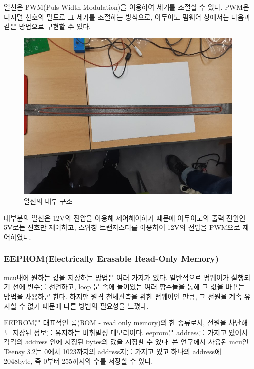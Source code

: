 \documentclass[twoside,11pt]{gshs_thesis}
\begin{document}
 열선은 PWM(Puls Width Modulation)을 이용하여 세기를 조절할 수 있다. PWM은 디지털 신호의 밀도로 그 세기를 조절하는 방식으로, 아두이노 펌웨어 상에서는 다음과 같은 방법으로 구현할 수 있다.
 \bigskip
\begin{figure}[h]
	\begin{center}
		\includegraphics[width = 12 cm]{thermicline2}
	\end{center}
	\caption{열선의 내부 구조}
	\label{thermicline2}
\end{figure}

 대부분의 열선은 12V의 전압을 이용해 제어해야하기 때문에 아두이노의 출력 전원인 5V로는 신호만 제어하고, 스위칭 트랜지스터를 이용하여 12V의 전압을 PWM으로 제어하였다.

\subsubsection{EEPROM(Electrically Erasable Read-Only Memory)}

  mcu내에 원하는 값을 저장하는 방법은 여러 가지가 있다. 일반적으로 펌웨어가 실행되기 전에 변수를 선언하고, loop 문 속에 들어있는 여러 함수들을 통해 그 값을 바꾸는 방법을 사용하곤 한다. 하지만 원격 천체관측을 위한 펌웨어인 만큼, 그 전원을 계속 유지할 수 없기 때문에 다른 방법의 필요성을 느꼈다.
  
  EEPROM은 대표적인 롬(ROM - read only memory)의 한 종류로서, 전원을 차단해도 저장된 정보를 유지하는 비휘발성 메모리이다. eeprom은 address를 가지고 있어서 각각의 address 안에 지정된 bytes의 값을 저장할 수 있다. 본 연구에서 사용된 mcu인 Teensy 3.2는 0에서 1023까지의 address지를 가지고 있고 하나의 address에 2048byte, 즉 0부터 255까지의 수를 저장할 수 있다. 
 
\end{document}

